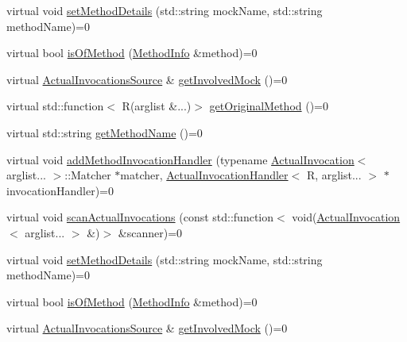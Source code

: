 \begin{DoxyCompactItemize}
\item 
virtual void \mbox{\hyperlink{structfakeit_1_1MethodMockingContext_1_1Context_a9eb0cf6ed84ea4bd63333503bd6bdc1a}{set\+Method\+Details}} (std\+::string mock\+Name, std\+::string method\+Name)=0
\item 
virtual bool \mbox{\hyperlink{structfakeit_1_1MethodMockingContext_1_1Context_a126835068d4a7bcbf01f47080e690510}{is\+Of\+Method}} (\mbox{\hyperlink{structfakeit_1_1MethodInfo}{Method\+Info}} \&method)=0
\item 
virtual \mbox{\hyperlink{structfakeit_1_1ActualInvocationsSource}{Actual\+Invocations\+Source}} \& \mbox{\hyperlink{structfakeit_1_1MethodMockingContext_1_1Context_aab7f9487475b01f85e81b76cdf6c4860}{get\+Involved\+Mock}} ()=0
\item 
virtual std\+::function$<$ R(arglist \&...)$>$ \mbox{\hyperlink{structfakeit_1_1MethodMockingContext_1_1Context_a1878bb27937f4984d5c43e20c2b0b626}{get\+Original\+Method}} ()=0
\item 
virtual std\+::string \mbox{\hyperlink{structfakeit_1_1MethodMockingContext_1_1Context_ab5f7cc2c8d00214baacaad4c49ccf17f}{get\+Method\+Name}} ()=0
\item 
virtual void \mbox{\hyperlink{structfakeit_1_1MethodMockingContext_1_1Context_a87b3a2d95daf8aaa2ae56b49e032c275}{add\+Method\+Invocation\+Handler}} (typename \mbox{\hyperlink{structfakeit_1_1ActualInvocation}{Actual\+Invocation}}$<$ arglist... $>$\+::Matcher $\ast$matcher, \mbox{\hyperlink{structfakeit_1_1ActualInvocationHandler}{Actual\+Invocation\+Handler}}$<$ R, arglist... $>$ $\ast$invocation\+Handler)=0
\item 
virtual void \mbox{\hyperlink{structfakeit_1_1MethodMockingContext_1_1Context_a89b30ea54bcf5e55c19696f77ad8423b}{scan\+Actual\+Invocations}} (const std\+::function$<$ void(\mbox{\hyperlink{structfakeit_1_1ActualInvocation}{Actual\+Invocation}}$<$ arglist... $>$ \&)$>$ \&scanner)=0
\item 
virtual void \mbox{\hyperlink{structfakeit_1_1MethodMockingContext_1_1Context_a9eb0cf6ed84ea4bd63333503bd6bdc1a}{set\+Method\+Details}} (std\+::string mock\+Name, std\+::string method\+Name)=0
\item 
virtual bool \mbox{\hyperlink{structfakeit_1_1MethodMockingContext_1_1Context_a126835068d4a7bcbf01f47080e690510}{is\+Of\+Method}} (\mbox{\hyperlink{structfakeit_1_1MethodInfo}{Method\+Info}} \&method)=0
\item 
virtual \mbox{\hyperlink{structfakeit_1_1ActualInvocationsSource}{Actual\+Invocations\+Source}} \& \mbox{\hyperlink{structfakeit_1_1MethodMockingContext_1_1Context_aab7f9487475b01f85e81b76cdf6c4860}{get\+Involved\+Mock}} ()=0

\end{DoxyCompactItemize}
